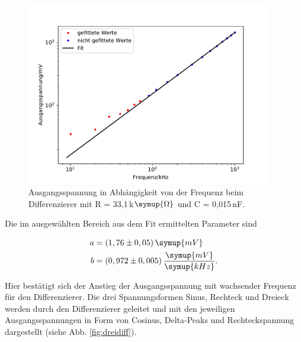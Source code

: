             \begin{figure}
                \centering
                \includegraphics[height=8cm]{differenzierer.pdf}
                \caption{Ausgangsspannung in Abhängigkeit von der Frequenz 
                beim Differenzierer mit R = 33,1\,k$\symup{\Omega}$ und C = 0,015\,nF.}
                \label{fig:diff}
            \end{figure}

            Die im ausgewählten Bereich aus dem Fit ermittelten Parameter sind

            \begin{align*}
                a &= (1,76\pm 0,05)\,\symup{mV}\\
                b &= (0,972\pm 0,005)\,\frac{\symup{mV}}{\symup{kHz}}.\\
            \end{align*}

            Hier bestätigt sich der Anstieg der Ausgangsspannung mit wachsender Frequenz für den Differenzierer.
            Die drei Spannungsformen Sinus, Rechteck und Dreieck werden durch den Differenzierer geleitet und mit 
            den jeweiligen Ausgangsspannungen in Form von Cosinus, Delta-Peaks und Rechteckspannung dargestellt (siehe Abb. 
            \ref{fig:dreidiff}).


